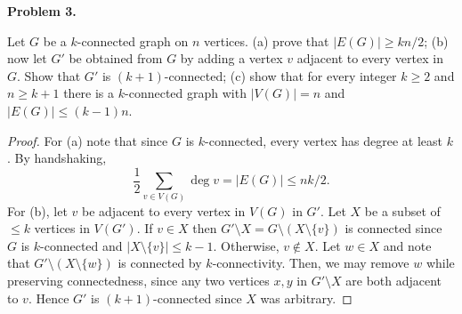 \noindent\textbf{Problem 3.}

Let \( G \) be a \( k \)-connected graph on \( n \) vertices. (a) prove that \( |E(G)| \geq kn/2 \); (b) now let \( G' \) be obtained from \( G \) by adding a vertex \( v \) adjacent to every vertex in \( G \). Show that \( G' \) is \( (k+1) \)-connected; (c) show that for every integer \( k \geq 2 \) and \( n \geq k + 1 \) there is a \( k \)-connected graph with \( |V(G)| = n \) and \( |E(G)| \leq (k-1)n \).
\begin{proof}
	For (a) note that since \( G \) is \( k \)-connected, every vertex has degree at least \( k \). By handshaking, \[ \frac{1}{2}  \sum_{v \in V(G)}^{} \deg v = |E(G)| \leq nk/2.  \] For (b), let \( v \) be adjacent to every vertex in \( V(G) \) in \( G' \). Let \( X \) be a subset of \( \leq k \) vertices in \( V(G') \). If \( v \in X \) then \( G'\setminus X = G \setminus (X \setminus \{ v \} ) \) is connected since \( G \) is \( k \)-connected and \( |X \setminus \{ v \} | \leq k - 1 \). Otherwise, \( v \notin X \). Let \( w \in X \) and note that \( G' \setminus (X \setminus \{ w \} ) \) is connected by \( k \)-connectivity. Then, we may remove \( w \) while preserving connectedness, since any two vertices \( x,y \) in \( G' \setminus X \) are both adjacent to \( v \). Hence \( G' \) is \( (k+1) \)-connected since \( X \) was arbitrary.
\end{proof}
